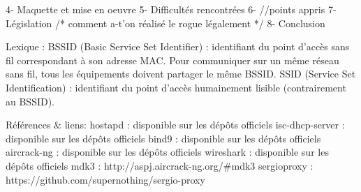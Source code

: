 4- Maquette et mise en oeuvre 
5- Difficultés rencontrées
6- //points appris
7- Législation /* comment a-t'on réalisé le rogue légalement */
8- Conclusion

Lexique :
BSSID (Basic Service Set Identifier) : identifiant du point d'accès sans fil correspondant à son adresse MAC. Pour communiquer sur un même réseau sans fil, tous les équipements doivent partager le même BSSID.
SSID (Service Set Identification) : identifiant du point d'accès humainement lisible (contrairement au BSSID).

Références & liens:
hostapd : disponible sur les dépôts officiels
isc-dhcp-server : disponible sur les dépôts officiels
bind9 : disponible sur les dépôts officiels
aircrack-ng : disponible sur les dépôts officiels
wireshark : disponible sur les dépôts officiels
mdk3 : http://aspj.aircrack-ng.org/#mdk3
sergioproxy : https://github.com/supernothing/sergio-proxy
